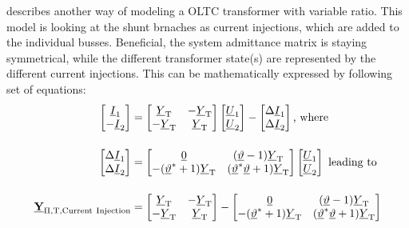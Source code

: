 \textcite{machowski_2020} describes another way of modeling a \acs{OLTC} transformer with variable ratio.
This model is looking at the shunt brnaches as current injections, which are added to the individual busses.
Beneficial, the system admittance matrix is staying symmetrical, while the different transformer state(s) are represented by the different current injections.
This can be mathematically expressed by following set of equations:
\begin{align}
    \begin{bmatrix}
        \underline{I}_1 \\
        -\underline{I}_2
    \end{bmatrix} &=
    \begin{bmatrix}
        \underline{Y}_\mathrm{T} & -\underline{Y}_\mathrm{T} \\
        -\underline{Y}_\mathrm{T} & \underline{Y}_\mathrm{T}
    \end{bmatrix}
    \begin{bmatrix}
        \underline{U}_1 \\
        \underline{U}_2
    \end{bmatrix} -
    \begin{bmatrix}
        \Delta \underline{I}_1 \\
        \Delta \underline{I}_2
    \end{bmatrix}\text{, where } \notag \\[12pt]
    \begin{bmatrix}
        \Delta \underline{I}_1 \\
        \Delta \underline{I}_2
    \end{bmatrix} &=
    \begin{bmatrix}
        \underline{0} & (\underline{\vartheta}-1)\underline{Y}_\mathrm{T} \\
        -(\underline{\vartheta}^*+1)\underline{Y}_\mathrm{T} & (\underline{\vartheta}^*\underline{\vartheta}+1)\underline{Y}_\mathrm{T}
    \end{bmatrix}
    \begin{bmatrix}
        \underline{U}_1 \\
        \underline{U}_2
    \end{bmatrix} \text{ leading to } \notag \\[12pt]
    \underline{\mab{Y}}_\mathrm{\Pi,T,Current~Injection}&= 
    \begin{bmatrix}
        \underline{Y}_\mathrm{T} & -\underline{Y}_\mathrm{T} \\
        -\underline{Y}_\mathrm{T} & \underline{Y}_\mathrm{T}
    \end{bmatrix} -
    \begin{bmatrix}
        \underline{0} & (\underline{\vartheta}-1)\underline{Y}_\mathrm{T} \\
        -(\underline{\vartheta}^*+1)\underline{Y}_\mathrm{T} & (\underline{\vartheta}^*\underline{\vartheta}+1)\underline{Y}_\mathrm{T}
    \end{bmatrix} \notag %
\end{align}


